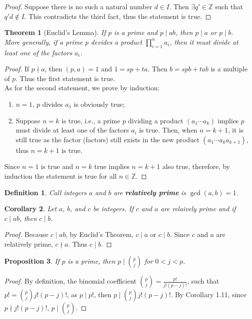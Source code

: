 \documentclass{article}
\newtheorem*{definition}{Definition}
\newtheorem{theorem}{Theorem}[section]
\newtheorem{proposition}[theorem]{Proposition}
\newtheorem{corollary}[theorem]{Corollary}
\begin{document}
    \begin{proof}
        Suppose there is no such a natural number \(d \in I\). Then \(\exists q' \in \mathbb{Z}\)
        such that \(q'd \notin I\). This contradicts the third fact, thus the statement is true.
    \end{proof}
    \begin{theorem}[Euclid's Lemma]
        If \(p\) is a prime and \(p \mid ab\), then \(p \mid a\) or \(p \mid b\). More 
        generally, if a prime \(p\) devides a product \(\prod_{i=1}^n a_i\), then it must 
        divide at least one of the factors \(a_i\).
    \end{theorem}
    \begin{proof}
        If \(p \nmid a\), then \((p, a)=1\) and \(1=sp+ta\). Then \(b=spb+tab\) is a 
        multiple of \(p\). Thus the first statement is true.\\
        As for the second statement, we prove by induction:
        \begin{enumerate}
            \item \(n=1\), \(p\) divides \(a_1\) is obviously true;
            \item Suppose \(n=k\) is true, i.e., a prime \(p\) dividing a product 
            \((a_1\cdots a_k)\) implies \(p\) must divide at least one of the factors 
            \(a_i\) is true. Then, when \(n=k+1\), it is still true as the factor (factors) 
            still exists in the new product \((a_1\cdots a_k a_{k+1})\), thus \(n=k+1\) is 
            true.
        \end{enumerate}
        Since \(n=1\) is true and \(n=k\) true implies \(n=k+1\) also true, therefore, by 
        induction the statement is true for all \(n \in \mathbb{Z}\).
    \end{proof}
    \begin{definition}
        Call integers \(a\) and \(b\) are \textbf{relatively prime} is \(\gcd(a, b)=1\).
    \end{definition}
    \begin{corollary}
        Let \(a\), \(b\), and \(c\) be integers. If \(c\) and \(a\) are relaively prime 
        and if \(c \mid ab\), then \(c \mid b\).
    \end{corollary}
    \begin{proof}
        Because \(c \mid ab\), by Euclid's Theorem, \(c \mid a\) or \(c \mid b\). 
        Since \(c\) and \(a\) are relatively prime, \(c \nmid a\). Thus \(c \mid b\).
    \end{proof}
    \begin{proposition}
        If \(p\) is a prime, then \(p \mid \binom{p}{j}\) for \(0 < j < p\).
    \end{proposition}
    \begin{proof}
        By definition, the binomial coefficient \(\binom{p}{j}=\frac{p!}{j!(p-j)!}\), 
        such that \(p!=\binom{p}{j} j! (p-j)!\), as \(p \mid p!\), then \(p \mid \binom{p}{j}j!(p-j)!\). 
        By Corollary 1.11, since \(p \nmid j!(p-j)!\), \(p \mid \binom{p}{j}\).
    \end{proof}
    
\end{document}
